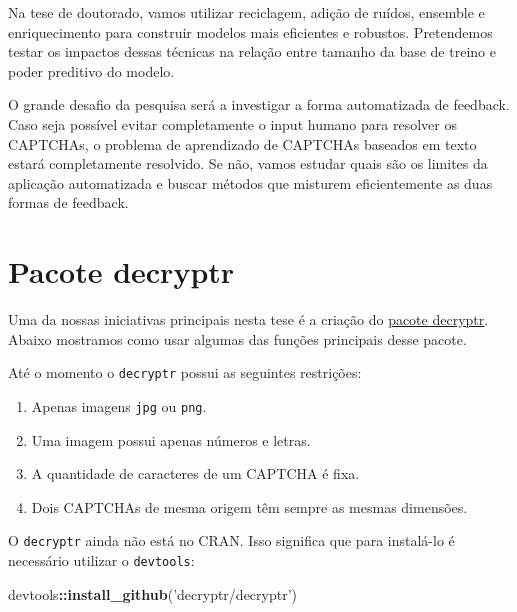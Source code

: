 \documentclass[12pt,]{report}
\newenvironment{Shaded}{\begin{snugshade}}{\end{snugshade}}
\newcommand{\KeywordTok}[1]{\textcolor[rgb]{0.13,0.29,0.53}{\textbf{#1}}}
\newcommand{\StringTok}[1]{\textcolor[rgb]{0.31,0.60,0.02}{#1}}
\newcommand{\OperatorTok}[1]{\textcolor[rgb]{0.81,0.36,0.00}{\textbf{#1}}}
\newcommand{\NormalTok}[1]{#1}
\providecommand{\tightlist}{%
  \setlength{\itemsep}{0pt}\setlength{\parskip}{0pt}}
\begin{document}
Na tese de doutorado, vamos utilizar reciclagem, adição de ruídos,
ensemble e enriquecimento para construir modelos mais eficientes e
robustos. Pretendemos testar os impactos dessas técnicas na relação
entre tamanho da base de treino e poder preditivo do modelo.

O grande desafio da pesquisa será a investigar a forma automatizada de
feedback. Caso seja possível evitar completamente o input humano para
resolver os CAPTCHAs, o problema de aprendizado de CAPTCHAs baseados em
texto estará completamente resolvido. Se não, vamos estudar quais são os
limites da aplicação automatizada e buscar métodos que misturem
eficientemente as duas formas de feedback.

\clearpage

\appendix {}


\chapter{Pacote decryptr}\label{pacote-decryptr}

Uma da nossas iniciativas principais nesta tese é a criação do
\href{https://github.com/decryptr/decryptr}{pacote decryptr}. Abaixo
mostramos como usar algumas das funções principais desse pacote.

Até o momento o \texttt{decryptr} possui as seguintes restrições:

\begin{enumerate}
\def\labelenumi{\arabic{enumi}.}
\tightlist
\item
  Apenas imagens \texttt{jpg} ou \texttt{png}.
\item
  Uma imagem possui apenas números e letras.
\item
  A quantidade de caracteres de um CAPTCHA é fixa.
\item
  Dois CAPTCHAs de mesma origem têm sempre as mesmas dimensões.
\end{enumerate}

O \texttt{decryptr} ainda não está no CRAN. Isso significa que para
instalá-lo é necessário utilizar o \texttt{devtools}:

\begin{Shaded}
\begin{Highlighting}[]
\NormalTok{devtools}\OperatorTok{::}\KeywordTok{install_github}\NormalTok{(}\StringTok{'decryptr/decryptr'}\NormalTok{)}
\end{Highlighting}
\end{Shaded}
\end{document}
